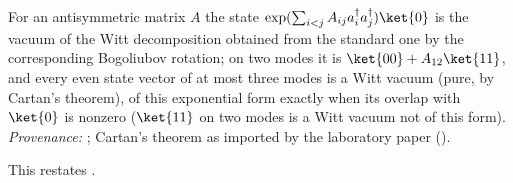 For an antisymmetric matrix $A$ the state $\exp(\sum_{i<j}A_{ij}a^{\dagger}_{i}a^{\dagger}_{j})\ket{0}$ is the vacuum of the Witt decomposition obtained from the standard one by the corresponding Bogoliubov rotation; on two modes it is $\ket{00} + A_{12}\ket{11}$, and every even state vector of at most three modes is a Witt vacuum (pure, by Cartan's theorem), of this exponential form exactly when its overlap with $\ket{0}$ is nonzero ($\ket{11}$ on two modes is a Witt vacuum not of this form). \emph{Provenance:} \cite{Thouless1960}; Cartan's theorem as imported by the laboratory paper \cite[Fact~2.10]{ButlerT16} ().

This restates .
